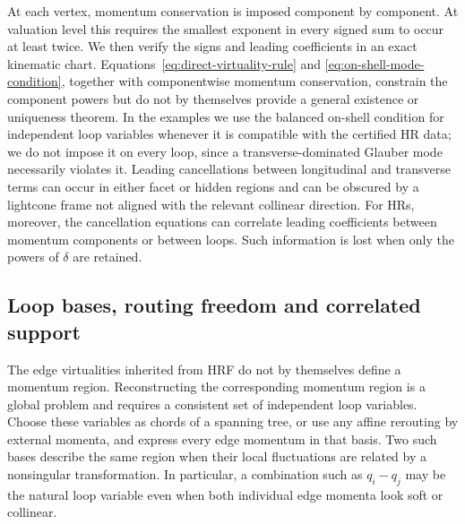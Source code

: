 \documentclass[a4paper,11pt]{article}
\begin{document}
At each vertex, momentum conservation is imposed component by component.
At valuation level this requires the smallest exponent in every signed sum
to occur at least twice.  We then verify the signs and leading coefficients
in an exact kinematic chart.  Equations~\eqref{eq:direct-virtuality-rule} and
\eqref{eq:on-shell-mode-condition}, together with componentwise momentum
conservation, constrain the component powers but do not by themselves provide
a general existence or uniqueness theorem.  In the examples we use the
balanced on-shell condition for independent loop variables whenever it is compatible
with the certified HR data; we do not impose it on every loop, since a
transverse-dominated Glauber mode necessarily violates it.  Leading cancellations
between longitudinal and transverse terms can occur in either facet or hidden
regions and can be obscured by a lightcone frame not aligned with the relevant
collinear direction.  For HRs, moreover, the cancellation equations can
correlate leading coefficients between momentum components or between loops.
Such information is lost when only the powers of \(\delta\) are retained.

\subsection{Loop bases, routing freedom and correlated support}

The edge virtualities inherited from HRF do not by themselves define a
momentum region.  Reconstructing the corresponding momentum region is a global
problem and requires a consistent set of independent loop variables.  Choose
these variables as chords of a spanning tree, or use any affine rerouting by
external momenta, and express every edge momentum in that basis.  Two such
bases describe the same region when their local fluctuations are related by
a nonsingular transformation.  In particular, a combination such as
\(q_i-q_j\) may be the natural loop variable even when both individual edge
momenta look soft or collinear.
\end{document}
